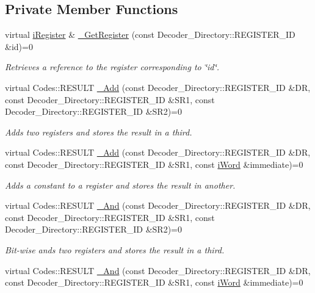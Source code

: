 \subsection*{Private Member Functions}
\begin{DoxyCompactItemize}
\item 
virtual \hyperlink{classiRegister}{iRegister} \& \hyperlink{classiWi11_a00f9ff87c8948464f435f00b10d20dfd}{\_\-GetRegister} (const Decoder\_\-Directory::REGISTER\_\-ID \&id)=0
\begin{DoxyCompactList}\small\item\em Retrieves a reference to the register corresponding to \char`\"{}id\char`\"{}. \item\end{DoxyCompactList}\item 
virtual Codes::RESULT \hyperlink{classiWi11_a45ebe6e8d33dbc94bfbec0aef22dae6a}{\_\-Add} (const Decoder\_\-Directory::REGISTER\_\-ID \&DR, const Decoder\_\-Directory::REGISTER\_\-ID \&SR1, const Decoder\_\-Directory::REGISTER\_\-ID \&SR2)=0
\begin{DoxyCompactList}\small\item\em Adds two registers and stores the result in a third. \item\end{DoxyCompactList}\item 
virtual Codes::RESULT \hyperlink{classiWi11_aee7d9647106b62eae74b6eeb29d0ab2d}{\_\-Add} (const Decoder\_\-Directory::REGISTER\_\-ID \&DR, const Decoder\_\-Directory::REGISTER\_\-ID \&SR1, const \hyperlink{classiWord}{iWord} \&immediate)=0
\begin{DoxyCompactList}\small\item\em Adds a constant to a register and stores the result in another. \item\end{DoxyCompactList}\item 
virtual Codes::RESULT \hyperlink{classiWi11_a6d18d19f9f93dcfeded98a13449de64b}{\_\-And} (const Decoder\_\-Directory::REGISTER\_\-ID \&DR, const Decoder\_\-Directory::REGISTER\_\-ID \&SR1, const Decoder\_\-Directory::REGISTER\_\-ID \&SR2)=0
\begin{DoxyCompactList}\small\item\em Bit-\/wise ands two registers and stores the result in a third. \item\end{DoxyCompactList}\item 
virtual Codes::RESULT \hyperlink{classiWi11_a4344763aa4efa0d384c9228b4b85e205}{\_\-And} (const Decoder\_\-Directory::REGISTER\_\-ID \&DR, const Decoder\_\-Directory::REGISTER\_\-ID \&SR1, const \hyperlink{classiWord}{iWord} \&immediate)=0

\end{DoxyCompactItemize}
